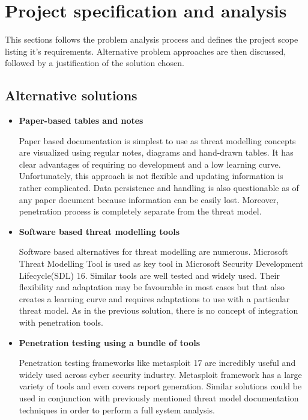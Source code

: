 \section{Project specification and analysis}
This sections follows the problem analysis process and defines the project scope listing it's requirements. Alternative problem approaches are then discussed, followed by a justification of the solution chosen.

\subsection{Alternative solutions}

	\begin{itemize}
		\item \textbf{Paper-based tables and notes}
		
		Paper based documentation is simplest to use as threat modelling concepts are visualized using regular notes, diagrams and hand-drawn tables. It has clear advantages of requiring no development and a low learning curve. Unfortunately, this approach is not flexible and updating information is rather complicated. Data persistence and handling is also questionable as of any paper document because  information can be easily lost. Moreover, penetration process is completely separate from the threat model.
		
		\item \textbf{Software based threat modelling tools}
		
		Software based alternatives for threat modelling are numerous. Microsoft Threat Modelling Tool is used as key tool in Microsoft Security Development Lifecycle(SDL) {16}. Similar tools are well tested and widely used. Their flexibility and adaptation may be favourable in most cases but that also creates a learning curve and requires adaptations to use with a particular threat model. As in the previous solution, there is no concept of integration with penetration tools.
				
		\item \textbf{Penetration testing using a bundle of tools}
		
		Penetration testing frameworks like metasploit {17} are incredibly useful and widely used across cyber security industry. Metasploit framework has a large variety of tools and even covers report generation. Similar solutions could be used in conjunction with previously mentioned threat model documentation techniques in order to perform a full system analysis.
		
	\end{itemize}

